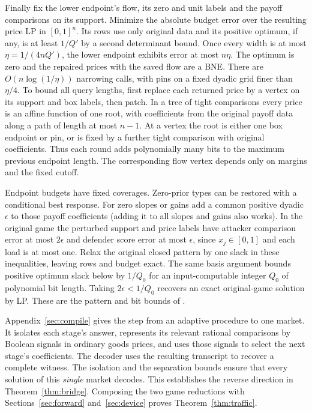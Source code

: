 \documentclass[11pt]{article}
\begin{document}
Finally fix the lower endpoint's flow, its zero and unit labels and
the payoff comparisons on its support. Minimize the absolute budget
error over the resulting price LP in \([0,1]^n\). Its rows use only
original data and its positive optimum, if any, is at least \(1/Q'\)
by a second determinant bound. Once every width is at most
\(\eta=1/(4nQ')\), the lower endpoint exhibits error at most \(n\eta\).
The optimum is zero and the repaired prices with the saved flow are a
BNE. There are \(O(n\log(1/\eta))\) narrowing calls, with pins on a
fixed dyadic grid finer than \(\eta/4\). To bound all query lengths,
first replace each returned price by a vertex on its support and box
labels, then patch. In a tree of tight comparisons every price is
an affine function of one root, with coefficients from the original
payoff data along a path of length at most \(n-1\). At a vertex the root
is either one box endpoint or pin, or is fixed by a further tight
comparison with original coefficients. Thus each round adds polynomially
many bits to the maximum previous endpoint length. The corresponding
flow vertex depends only on margins and the fixed cutoff.

Endpoint budgets have fixed coverages. Zero-prior types can be restored
with a conditional best response. For zero slopes or gains add a common
positive dyadic \(\epsilon\) to those payoff coefficients (adding it to
all slopes and gains also works). In the original game the perturbed
support and price labels have attacker comparison error at most
\(2\epsilon\) and defender score error at most \(\epsilon\), since
\(x_j\in[0,1]\) and each load is at most one. Relax the original closed
pattern by one slack in these inequalities, leaving rows and budget
exact. The same basis argument bounds positive optimum slack below by
\(1/Q_0\) for an input-computable integer \(Q_0\) of polynomial bit
length. Taking \(2\epsilon<1/Q_0\)
recovers an exact original-game solution by LP. These are the pattern
and bit bounds of \cite[Section~3.1]{book}.

Appendix~\ref{sec:compile} gives the step from an adaptive procedure to
one market. It isolates each stage's answer, represents its relevant
rational comparisons by Boolean signals in ordinary goods prices, and
uses those signals to select the next stage's coefficients. The decoder
uses the resulting transcript to recover a complete witness. The isolation and the separation bounds ensure
that every solution of this \emph{single} market decodes. This establishes
the reverse direction in Theorem~\ref{thm:bridge}. Composing the two
game reductions with Sections~\ref{sec:forward} and~\ref{sec:device}
proves Theorem~\ref{thm:traffic}.
\end{document}

